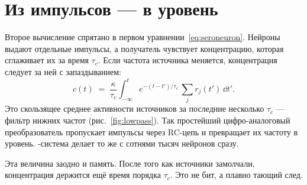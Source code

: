 \section{Из импульсов --- в уровень}

Второе вычисление спрятано в первом уравнении~\eqref{eq:seroneuron}. Нейроны выдают отдельные импульсы, а получатель чувствует концентрацию, которая сглаживает их за время $\tau_c$. Если частота источника меняется, концентрация следует за ней с запаздыванием:
\begin{equation}
c(t) \;=\; \frac{\kappa}{\tau_c}\int_{-\infty}^{t} e^{-(t-t')/\tau_c}\,\sum_j r_j(t')\,\dd t' .
\label{eq:lowpass}
\end{equation}
Это скользящее среднее активности источников за последние несколько $\tau_c$ --- фильтр нижних частот (рис.~\ref{fig:lowpass}). Так простейший цифро-аналоговый преобразователь пропускает импульсы через RC-цепь и превращает их частоту в уровень. -система делает то же с сотнями тысяч нейронов сразу.

Эта величина заодно и память. После того как источники замолчали, концентрация держится ещё время порядка $\tau_c$. Это не бит, а плавно тающий след.

